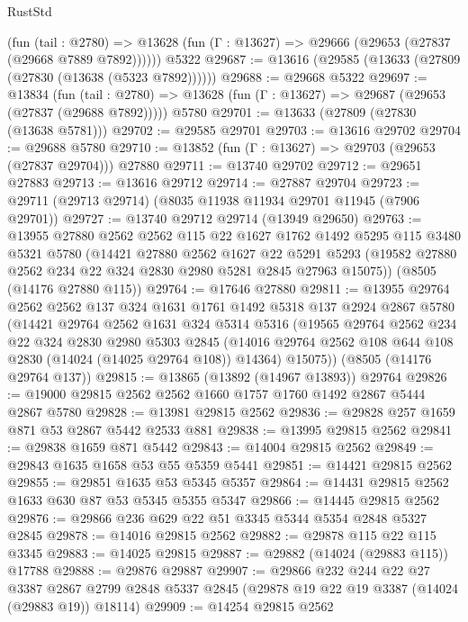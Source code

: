 \begin{lexlean}{RustStd}
\begin{coremodule}
      (fun (tail : @2780) =>
      @13628 (fun (Γ : @13627) => @29666 (@29653 (@27837 (@29668 @7889 @7892))))))
    @5322
@29687 := @13616 (@29585 (@13633 (@27809 (@27830 (@13638 (@5323 @7892))))))
@29688 := @29668 @5322
@29697 := @13834
    (fun (tail : @2780) => @13628 (fun (Γ : @13627) => @29687 (@29653 (@27837 (@29688 @7892)))))
    @5780
@29701 := @13633 (@27809 (@27830 (@13638 @5781)))
@29702 := @29585 @29701
@29703 := @13616 @29702
@29704 := @29688 @5780
@29710 := @13852 (fun (Γ : @13627) => @29703 (@29653 (@27837 @29704))) @27880
@29711 := @13740 @29702
@29712 := @29651 @27883
@29713 := @13616 @29712
@29714 := @27887 @29704
@29723 := @29711 (@29713 @29714) (@8035 @11938 @11934 @29701 @11945 (@7906 @29701))
@29727 := @13740 @29712 @29714 (@13949 @29650)
@29763 := @13955
    @27880
    @2562
    @2562
    @115
    @22
    @1627
    @1762
    @1492
    @5295
    @115
    @3480
    @5321
    @5780
    (@14421
      @27880
      @2562
      @1627
      @22
      @5291
      @5293
      (@19582 @27880 @2562 @234 @22 @324 @2830 @2980 @5281 @2845 @27963 @15075))
    (@8505 (@14176 @27880 @115))
@29764 := @17646 @27880
@29811 := @13955
    @29764
    @2562
    @2562
    @137
    @324
    @1631
    @1761
    @1492
    @5318
    @137
    @2924
    @2867
    @5780
    (@14421
      @29764
      @2562
      @1631
      @324
      @5314
      @5316
      (@19565
        @29764
        @2562
        @234
        @22
        @324
        @2830
        @2980
        @5303
        @2845
        (@14016 @29764 @2562 @108 @644 @108 @2830 (@14024 (@14025 @29764 @108)) @14364)
        @15075))
    (@8505 (@14176 @29764 @137))
@29815 := @13865 (@13892 (@14967 @13893)) @29764
@29826 := @19000 @29815 @2562 @2562 @1660 @1757 @1760 @1492 @2867 @5444 @2867 @5780
@29828 := @13981 @29815 @2562
@29836 := @29828 @257 @1659 @871 @53 @2867 @5442 @2533 @881
@29838 := @13995 @29815 @2562
@29841 := @29838 @1659 @871 @5442
@29843 := @14004 @29815 @2562
@29849 := @29843 @1635 @1658 @53 @55 @5359 @5441
@29851 := @14421 @29815 @2562
@29855 := @29851 @1635 @53 @5345 @5357
@29864 := @14431 @29815 @2562 @1633 @630 @87 @53 @5345 @5355 @5347
@29866 := @14445 @29815 @2562
@29876 := @29866 @236 @629 @22 @51 @3345 @5344 @5354 @2848 @5327 @2845
@29878 := @14016 @29815 @2562
@29882 := @29878 @115 @22 @115 @3345
@29883 := @14025 @29815
@29887 := @29882 (@14024 (@29883 @115)) @17788
@29888 := @29876 @29887
@29907 := @29866
    @232
    @244
    @22
    @27
    @3387
    @2867
    @2799
    @2848
    @5337
    @2845
    (@29878 @19 @22 @19 @3387 (@14024 (@29883 @19)) @18114)
@29909 := @14254 @29815 @2562

\end{coremodule}
\end{lexlean}
